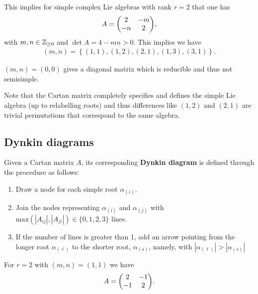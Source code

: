 This implies for simple complex Lie algebras with rank $r = 2$ that one has
\begin{align}
    A = \mqty( 2 & -m \\ -n & 2)
,\end{align}
with $m,n \in \mathbb{Z}_{\geq 0}$ and $\det A = 4 - m n > 0$. This implies we have
\begin{align}
    \left( m,n \right) = \left\{ \left( 1,1 \right) , \left( 1,2 \right) , \left( 2,1 \right) , \left( 1,3 \right) , \left( 3,1 \right)  \right\} 
.\end{align}
\begin{note}
    $\left( m,n \right) = \left( 0,0 \right) $ gives a diagonal matrix which is reducible and thus not semisimple.
\end{note}

Note that the Cartan matrix completely specifies and defines the simple Lie algebra (up to relabelling roots) and thus differences like $\left( 1,2 \right) $ and $\left( 2,1 \right) $ are trivial permutations that correspond to the same algebra.

\subsection{Dynkin diagrams}

\begin{definition}
    Given a Cartan matrix $A$, its corresponding \textbf{Dynkin diagram} is defined through the procedure as follows:
    \begin{enumerate}[label=\roman*)]
        \item Draw a node for each simple root $\alpha_{\left( i \right) }$.
        \item Join the nodes representing $\alpha_{\left( i \right) }$ and $\alpha_{\left( j \right) }$ with $\text{max}\left( \left| A_{ij} \right| , \left| A_{ji} \right|  \right) \in \{0, 1, 2, 3\} $ lines.
        \item If the number of lines is greater than 1, add an arrow pointing from the longer root $\alpha_{\left( \ell \right) }$ to the shorter root, $\alpha_{\left( s \right) }$, namely, with $\left| \alpha_{\left( \ell \right) } \right| > \left| \alpha_{\left( s \right) } \right| $
    \end{enumerate}
\end{definition}

\begin{example}
    For $r = 2$ with $\left( m,n \right) = \left( 1,1 \right) $ we have
    \begin{align}
        A = \mqty( 2 & -1 \\ -1 & 2 )
    .\end{align}
\end{example}

